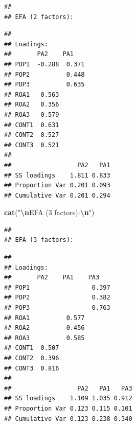 \documentclass[
  10pt,
]{article}
\newenvironment{Shaded}{\begin{snugshade}}{\end{snugshade}}
\newcommand{\AttributeTok}[1]{\textcolor[rgb]{0.13,0.29,0.53}{#1}}
\newcommand{\FloatTok}[1]{\textcolor[rgb]{0.00,0.00,0.81}{#1}}
\newcommand{\FunctionTok}[1]{\textcolor[rgb]{0.13,0.29,0.53}{\textbf{#1}}}
\newcommand{\NormalTok}[1]{#1}
\newcommand{\SpecialCharTok}[1]{\textcolor[rgb]{0.81,0.36,0.00}{\textbf{#1}}}
\newcommand{\StringTok}[1]{\textcolor[rgb]{0.31,0.60,0.02}{#1}}
\begin{document}
\begin{verbatim}
##
## EFA (2 factors):
\end{verbatim}

\begin{Shaded}
\end{Shaded}

\begin{verbatim}
##
## Loadings:
##       PA2    PA1
## POP1  -0.288  0.371
## POP2          0.448
## POP3          0.635
## ROA1   0.563
## ROA2   0.356
## ROA3   0.579
## CONT1  0.631
## CONT2  0.527
## CONT3  0.521
##
##                  PA2   PA1
## SS loadings    1.811 0.833
## Proportion Var 0.201 0.093
## Cumulative Var 0.201 0.294
\end{verbatim}

\begin{Shaded}
\begin{Highlighting}[]
\FunctionTok{cat}\NormalTok{(}\StringTok{"}\SpecialCharTok{\textbackslash{}n}\StringTok{EFA (3 factors):}\SpecialCharTok{\textbackslash{}n}\StringTok{"}\NormalTok{)}
\end{Highlighting}
\end{Shaded}

\begin{verbatim}
##
## EFA (3 factors):
\end{verbatim}

\begin{Shaded}
\end{Shaded}

\begin{verbatim}
##
## Loadings:
##       PA2    PA1    PA3
## POP1                 0.397
## POP2                 0.382
## POP3                 0.763
## ROA1          0.577
## ROA2          0.456
## ROA3          0.585
## CONT1  0.507
## CONT2  0.396
## CONT3  0.816
##
##                  PA2   PA1   PA3
## SS loadings    1.109 1.035 0.912
## Proportion Var 0.123 0.115 0.101
## Cumulative Var 0.123 0.238 0.340
\end{verbatim}
\end{document}
